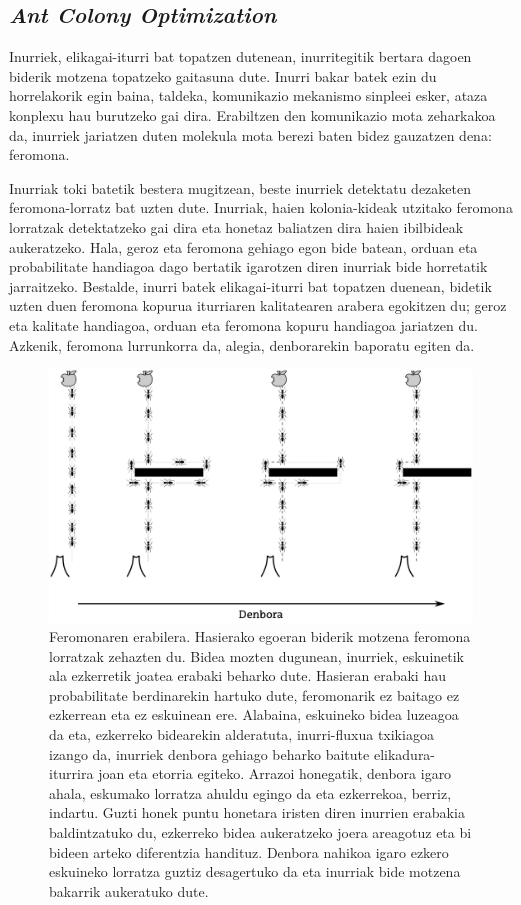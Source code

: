 \documentclass[eu]{ifirak}\usepackage[]{graphicx}\usepackage[]{color}
\newcommand{\eng}[1]{\textit{#1}}
\begin{document}
\subsection{\eng{Ant Colony Optimization}}

Inurriek, elikagai-iturri bat topatzen dutenean, inurritegitik bertara dagoen biderik motzena topatzeko gaitasuna dute. Inurri bakar batek ezin du horrelakorik egin baina, taldeka, komunikazio mekanismo sinpleei esker, ataza konplexu hau burutzeko gai dira. Erabiltzen den komunikazio mota zeharkakoa da, inurriek jariatzen duten molekula mota berezi baten bidez gauzatzen dena:  feromona. 

Inurriak toki batetik bestera mugitzean, beste inurriek detektatu dezaketen feromona-lorratz bat uzten dute. Inurriak, haien kolonia-kideak utzitako feromona lorratzak detektatzeko gai dira eta honetaz baliatzen dira haien ibilbideak aukeratzeko. Hala, geroz eta feromona gehiago egon bide batean, orduan eta probabilitate handiagoa dago bertatik igarotzen diren inurriak bide horretatik jarraitzeko. Bestalde, inurri batek elikagai-iturri bat topatzen duenean, bidetik uzten duen feromona kopurua iturriaren kalitatearen arabera egokitzen du; geroz eta kalitate handiagoa, orduan eta feromona kopuru handiagoa jariatzen du. Azkenik, feromona lurrunkorra da, alegia, denborarekin baporatu egiten da.

\begin{figure}[t]
\centering
\includegraphics[width=0.75\linewidth]{./Irudiak/ants}
\caption{Feromonaren erabilera. Hasierako egoeran biderik motzena feromona lorratzak zehazten du. Bidea mozten dugunean, inurriek, eskuinetik ala ezkerretik joatea erabaki beharko dute. Hasieran erabaki hau probabilitate berdinarekin hartuko dute, feromonarik ez baitago ez ezkerrean eta ez eskuinean ere. Alabaina, eskuineko bidea luzeagoa da eta, ezkerreko bidearekin alderatuta, inurri-fluxua txikiagoa izango da, inurriek denbora gehiago beharko baitute elikadura-iturrira joan eta etorria egiteko. Arrazoi honegatik, denbora igaro ahala, eskumako lorratza ahuldu egingo da eta ezkerrekoa, berriz, indartu. Guzti honek puntu honetara iristen diren inurrien erabakia baldintzatuko du, ezkerreko bidea aukeratzeko joera areagotuz eta bi bideen arteko diferentzia handituz. Denbora nahikoa igaro ezkero eskuineko lorratza guztiz desagertuko da eta inurriak bide motzena bakarrik aukeratuko dute.}
\label{fig:ants}
\end{figure}
\end{document}
